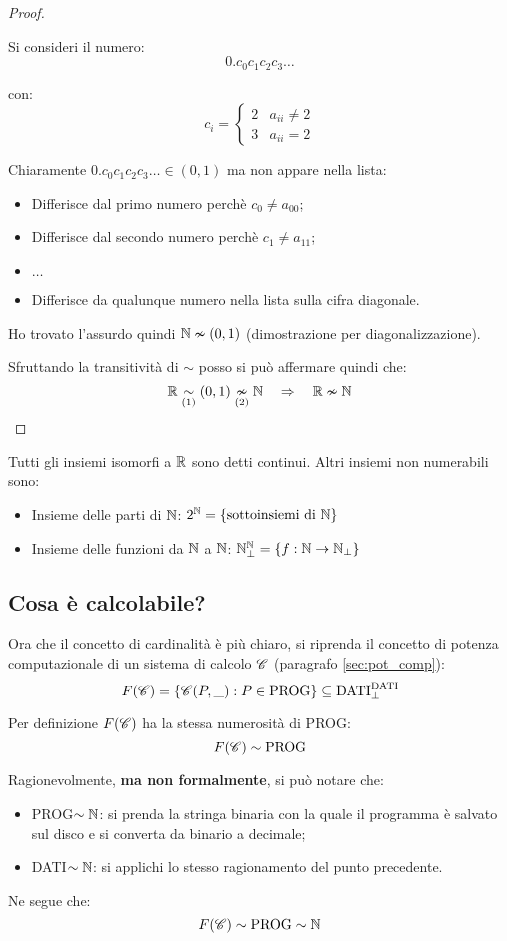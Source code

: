 \begin{proof}
\begin{enumerate}
\begin{minipage}{.48\textwidth}
                Si consideri il numero:
                $$ 0.c_0c_1c_2c_3\dots $$

                con: $$ c_i = \begin{cases}
                2 & a_{ii}\neq2\\
                3 & a_{ii}=2
                \end{cases} $$

            \end{minipage}
            Chiaramente $0.c_0c_1c_2c_3\dots\in(0,1)$ ma non appare nella lista:
            \begin{itemize}
                \item Differisce dal primo numero perchè $c_0\neq a_{00}$;
                \item Differisce dal secondo numero perchè $c_1\neq a_{11}$;
                \item $\dots$
                \item Differisce da qualunque numero nella lista sulla cifra 
                    {\color{red} diagonale}.
            \end{itemize}
            Ho trovato l'assurdo quindi $\mathbb{N} \nsim (0,1)$ (dimostrazione per 
            diagonalizzazione).
    \end{enumerate}
    Sfruttando la transitività di $\sim$ posso si può affermare quindi che:
    $$ \mathbb{R} \underset{(1)}{\sim} (0,1) \underset{(2)}{\nsim} \mathbb{N} \quad \Rightarrow \quad \mathbb{R} \nsim \mathbb{N} $$
\end{proof}

Tutti gli insiemi isomorfi a $\mathbb{R}$ sono detti continui. Altri insiemi non numerabili sono:
\begin{itemize}
    \item Insieme delle parti di $\mathbb{N}$: $2^{\mathbb{N}} = \{\text{sottoinsiemi di } \mathbb{N}\}$
    \item Insieme delle funzioni da $\mathbb{N}$ a $\mathbb{N}$:
        $\mathbb{N}^{\mathbb{N}}_\perp = \{f:\mathbb{N}\rightarrow\mathbb{N}_\perp\}$
\end{itemize}

\subsection{Cosa è calcolabile?}
Ora che il concetto di cardinalità è più chiaro, si riprenda il concetto di 
potenza computazionale di un sistema di calcolo $\mathcal{C}$ (paragrafo \ref{sec:pot_comp}):
$$
F(\mathcal{C}) = \{\mathcal{C}(P,\_):P\in\text{PROG}\} \subseteq \text{DATI}^{\text{DATI}}_\perp
$$

Per definizione $F(\mathcal{C})$ ha la stessa numerosità di PROG:
$$ F(\mathcal{C}) \sim \text{PROG} $$

Ragionevolmente, \textbf{ma non formalmente}, si può notare che:
\begin{itemize}
    \item PROG$\sim\mathbb{N}$: si prenda la stringa binaria con la quale il programma è
        salvato sul disco e si converta da binario a decimale;
    \item DATI$\sim\mathbb{N}$: si applichi lo stesso ragionamento del punto precedente.
\end{itemize}
Ne segue che:
$$ F(\mathcal{C}) \sim \text{PROG} \sim \mathbb{N} $$
